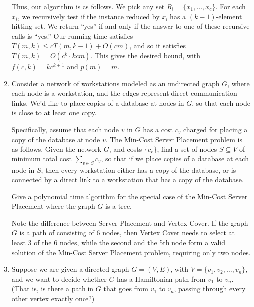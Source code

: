 \documentclass[12pt]{article}
\begin{document}
\begin{enumerate}
{Thus, our algorithm is as follows.
We pick any set $B_i = \{x_1, \ldots, x_c\}$.
For each $x_i$, we recursively test if the
instance reduced by $x_i$ has a $(k-1)$-element hitting set.
We return ``yes'' if and only if the answer to one of
these recursive calls is ``yes.''
Our running time satisfies $T(m,k) \leq c T(m,k-1) + O(cm)$,
and so it satisfies $T(m,k) = O(c^k \cdot kcm)$.
This gives the desired bound, with 
$f(c,k) = kc^{k+1}$ and $p(m) = m$.

}


\item 

Consider a network of workstations modeled as 
an undirected graph $G$, where each node is a workstation, and the edges
represent direct communication links. 
We'd like to place copies of a database at nodes in $G$,
so that each node is close to at least one copy.

Specifically, assume that each node $v$ in $G$
has a cost $c_v$ charged for placing a copy of the database at node $v$. 
The {\sc Min-Cost Server Placement} problem is as follows.
Given the network $G$, and costs $\{c_v\}$, 
find a set of nodes $S \subseteq V$
of minimum total cost $\sum_{v \in S} c_v$, so that 
if we place copies of a database at each node in $S$,
then every workstation either has a copy of the database, or is
connected by a direct link to a workstation that has a copy of the database.

Give a polynomial time algorithm for the special case of the
{\sc Min-Cost Server Placement} where the graph $G$ is a tree.

Note the difference between {\sc Server Placement} and {\sc Vertex Cover}.
If the graph $G$ is a path of consisting of 6 nodes, then {\sc Vertex Cover}
needs to select at least 3 of the 6 nodes, while the second and the 5th node
form a valid solution of the 
{\sc Min-Cost Server Placement} problem, requiring only two nodes.





\item 

Suppose we are given a directed graph $G = (V,E)$,
with $V = \{v_1, v_2, \ldots, v_n\}$, and we want
to decide whether $G$ has a Hamiltonian path
from $v_1$ to $v_n$.
(That is, is there a path in $G$ that goes from
$v_1$ to $v_n$, passing through every other vertex exactly once?)


\end{enumerate}
\end{document}
